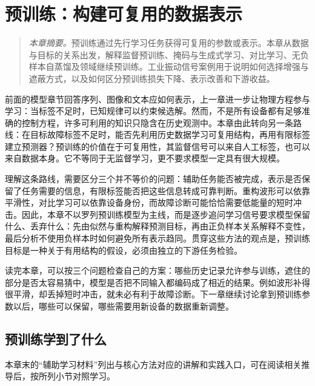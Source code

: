 ﻿\chapter{预训练：构建可复用的数据表示}
\label{chap:pretraining}
\begin{quote}\small
\textit{本章摘要。}预训练通过先行学习任务获得可复用的参数或表示。本章从数据与目标的关系出发，解释监督预训练、掩码与生成式学习、对比学习、无负样本自蒸馏及领域继续预训练。工业振动信号案例用于说明如何选择增强与遮蔽方式，以及如何区分预训练损失下降、表示改善和下游收益。
\end{quote}

前面的模型章节回答序列、图像和文本应如何表示，上一章进一步让物理方程参与学习：当标签不足时，已知规律可以约束候选解。然而，不是所有设备都有足够准确的控制方程，许多可利用的知识只隐含在历史观测中。本章由此转向另一条路线：在目标故障标签不足时，能否先利用历史数据学习可复用结构，再用有限标签建立预测器？预训练的价值在于可复用性，其监督信号可以来自人工标签，也可以来自数据本身。它不等同于无监督学习，更不要求模型一定具有很大规模。

理解这条路线，需要区分三个并不等价的问题：辅助任务能否被完成，表示是否保留了任务需要的信息，有限标签能否把这些信息转成可靠判断。重构波形可以依靠平滑性，对比学习可以依靠设备身份，而故障诊断可能恰恰需要低能量的短时冲击。因此，本章不以罗列预训练模型为主线，而是逐步追问学习信号要求模型保留什么、丢弃什么：先由似然与重构解释预测目标，再由正负样本关系解释不变性，最后分析不使用负样本时如何避免所有表示趋同。贯穿这些方法的观点是，预训练目标是一种关于有用结构的假设，必须由独立的下游任务检验。

读完本章，可以按三个问题检查自己的方案：哪些历史记录允许参与训练，遮住的部分是否太容易猜中，模型是否把不同输入都编码成了相近的结果。例如波形补得很平滑，却丢掉短时冲击，就未必有利于故障诊断。下一章继续讨论拿到预训练参数以后，哪些可以保留，哪些需要用新设备的数据重新调整。

\section{预训练学到了什么}

本章末的“辅助学习材料”列出与核心方法对应的讲解和实践入口，可在阅读相关推导后，按所列小节对照学习。

